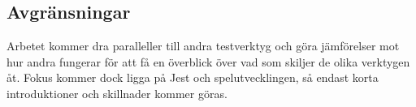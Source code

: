 \subsection{Avgränsningar}
Arbetet kommer dra paralleller till andra testverktyg och göra jämförelser mot hur andra fungerar för att få en överblick över vad som skiljer de olika verktygen åt. Fokus kommer dock ligga på Jest och spelutvecklingen, så endast korta introduktioner och skillnader kommer göras.




